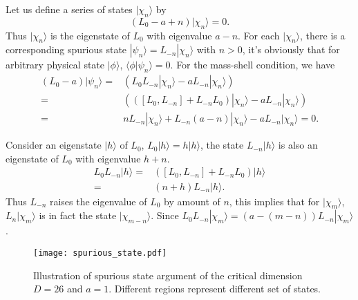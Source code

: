 \documentclass[graybox,envcountchap,sectrefs]{svmono}
\begin{document}
Let us define a series of states $|\chi_n\rangle$ by
\begin{equation}
\left(L_0-a+n \right)|\chi_n\rangle=0.	
\end{equation}
Thus $|\chi_n\rangle$ is the eigenstate of $L_0$ with eigenvalue $a-n$. For each $|\chi_n\rangle$, there is a corresponding spurious state $|\psi_n\rangle=L_{-n}|\chi_n\rangle$ with $n>0$, it's obviously that for arbitrary physical state $|\phi\rangle$, $\langle \phi |\psi_n\rangle=0$. For the mass-shell condition, we have
\begin{align}
(L_0-a)	|\psi_n\rangle=&(L_0L_{-n}|\chi_n\rangle-aL_{-n}|\chi_n\rangle)\nonumber\\
=&\left(([L_0,L_{-n}]+L_{-n}L_0)|\chi_n\rangle-aL_{-n}|\chi_n\rangle\right)\nonumber\\
=&nL_{-n}|\chi_n\rangle +L_{-n}(a-n)|\chi_n\rangle-aL_{-n}|\chi_n\rangle=0.
\end{align}


Consider an eigenstate $|h\rangle$ of $L_0$, $L_0|h\rangle =h|h\rangle$, the state $L_{-n}|h\rangle$ is also an eigenstate of $L_0$ with eigenvalue $h+n$.
\begin{align}
L_0L_{-n}|h\rangle=&([L_0,L_{-n}]+L_{-n}L_0)	|h\rangle\nonumber\\
=&(n+h)L_{-n}|h\rangle.
\end{align}
Thus $L_{-n}$ raises the eigenvalue of $L_0$ by amount of $n$, this implies that for $|\chi_m\rangle$, $L_n|\chi_m\rangle$ is in fact the state $|\chi_{m-n}\rangle$. Since $L_0L_{-n}|\chi_m\rangle=(a-(m-n))L_{-n}|\chi_m\rangle$.


\begin{figure}[t]
  \centering
  \texttt{[image: spurious\_state.pdf]}\\
\caption{Illustration of spurious state argument of the critical dimension $D=26$ and $a=1$. Different regions represent different set of states.}
\label{fig:spurious}
\end{figure}
\end{document}
